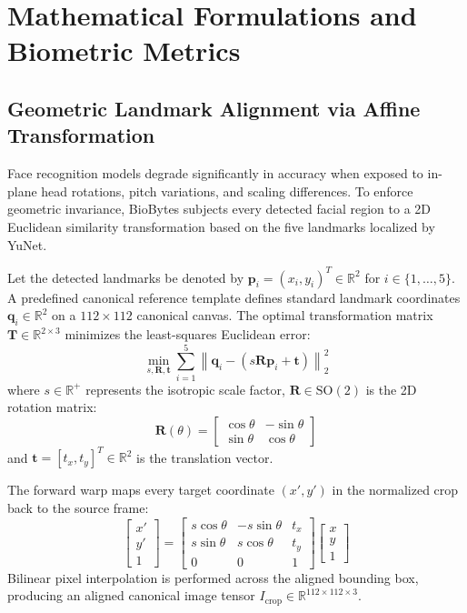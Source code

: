 \chapter{Mathematical Formulations and Biometric Metrics}

\section{Geometric Landmark Alignment via Affine Transformation}
Face recognition models degrade significantly in accuracy when exposed to in-plane head rotations, pitch variations, and scaling differences. To enforce geometric invariance, BioBytes subjects every detected facial region to a 2D Euclidean similarity transformation based on the five landmarks localized by YuNet.

Let the detected landmarks be denoted by $\mathbf{p}_i = (x_i, y_i)^T \in \mathbb{R}^2$ for $i \in \{1, \dots, 5\}$. A predefined canonical reference template defines standard landmark coordinates $\mathbf{q}_i \in \mathbb{R}^2$ on a $112 \times 112$ canonical canvas. The optimal transformation matrix $\mathbf{T} \in \mathbb{R}^{2 \times 3}$ minimizes the least-squares Euclidean error:
\begin{equation}
\min_{s, \mathbf{R}, \mathbf{t}} \sum_{i=1}^{5} \left\| \mathbf{q}_i - \left( s \mathbf{R} \mathbf{p}_i + \mathbf{t} \right) \right\|_2^2
\end{equation}
where $s \in \mathbb{R}^+$ represents the isotropic scale factor, $\mathbf{R} \in \text{SO}(2)$ is the 2D rotation matrix:
\begin{equation}
\mathbf{R}(\theta) = \begin{bmatrix} \cos\theta & -\sin\theta \\ \sin\theta & \cos\theta \end{bmatrix}
\end{equation}
and $\mathbf{t} = [t_x, t_y]^T \in \mathbb{R}^2$ is the translation vector.

The forward warp maps every target coordinate $(x', y')$ in the normalized crop back to the source frame:
\begin{equation}
\begin{bmatrix} x' \\ y' \\ 1 \end{bmatrix} = \begin{bmatrix} s\cos\theta & -s\sin\theta & t_x \\ s\sin\theta & s\cos\theta & t_y \\ 0 & 0 & 1 \end{bmatrix} \begin{bmatrix} x \\ y \\ 1 \end{bmatrix}
\end{equation}
Bilinear pixel interpolation is performed across the aligned bounding box, producing an aligned canonical image tensor $I_{\text{crop}} \in \mathbb{R}^{112 \times 112 \times 3}$.

